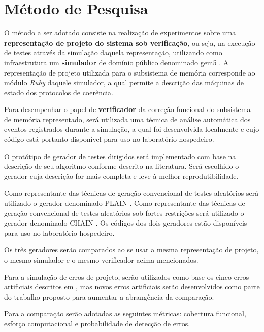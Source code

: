 \documentclass{ufsc-thesis}
\begin{document}
\section{Método de Pesquisa}

O método a ser adotado consiste na realização de experimentos sobre uma
\textbf{representação de projeto do sistema sob verificação}, ou seja, na
execução de testes através da simulação daquela representação, utilizando como
infraestrutura um \textbf{simulador} de domínio público denominado gem5
\cite{Gem5:2012}. A representação de projeto utilizada para o subsistema de
memória corresponde ao módulo \textit{Ruby} daquele simulador, a qual permite a
descrição das máquinas de estado dos protocolos de coerência.

Para desempenhar o papel de \textbf{verificador} da correção funcional do
subsistema de memória representado, será utilizada uma técnica de análise
automática dos eventos registrados durante a simulação, a qual foi desenvolvida
localmente \cite{Freitas:2013} e cujo código está portanto disponível para uso
no laboratório hospedeiro.

O protótipo de gerador de testes dirigidos será implementado com base na
descrição de seu algoritmo conforme descrito na literatura. Será escolhido o
gerador cuja descrição for mais completa e leve à melhor reprodutibilidade.

Como representante das técnicas de geração convencional de testes aleatórios
será utilizado o gerador denominado PLAIN \cite{Rambo:2011}. Como representante
das técnicas de geração convencional de testes aleatórios sob fortes restrições
será utilizado o gerador denominado CHAIN \cite{Andrade:2016a}. Os códigos dos
dois geradores estão disponíveis para uso no laboratório hospedeiro.

Os três geradores serão comparados ao se usar a mesma representação de projeto,
o mesmo simulador e o mesmo verificador acima mencionados.

Para a simulação de erros de projeto, serão utilizados como base os cinco erros
artificiais descritos em \cite{Andrade:2016b}, mas novos erros artificiais
serão desenvolvidos como parte do trabalho proposto para aumentar a abrangência
da comparação.

Para a comparação serão adotadas as seguintes métricas: cobertura funcional,
esforço computacional e probabilidade de detecção de erros.

\end{document}
